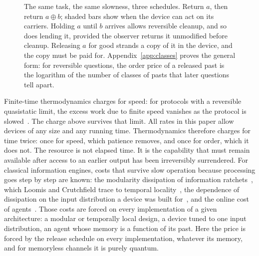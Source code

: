 \begin{figure}[t]
\centering
{}
\caption{The same task, the same slowness, three schedules. Return $a$, then return $a\oplus b$; shaded bars show when the device can act on its carriers. Holding $a$ until $b$ arrives allows reversible cleanup, and so does lending it, provided the observer returns it unmodified before cleanup. Releasing $a$ for good strands a copy of it in the device, and the copy must be paid for. Appendix~\ref{app:classes} proves the general form: for reversible questions, the order price of a released past is the logarithm of the number of classes of pasts that later questions tell apart.}
\label{fig:three}
\end{figure}

Finite-time thermodynamics charges for speed: for protocols with a reversible quasistatic limit, the excess work due to finite speed vanishes as the protocol is slowed~\cite{SalamonBerry83,Crooks07,Proesmans20}. The charge above survives that limit. All rates in this paper allow devices of any size and any running time. Thermodynamics therefore charges for time twice: once for speed, which patience removes, and once for order, which it does not. The resource is not elapsed time. It is the capability that must remain available after access to an earlier output has been irreversibly surrendered. For classical information engines, costs that survive slow operation because processing goes step by step are known: the modularity dissipation of information ratchets~\cite{BMC18}, which Loomis and Crutchfield trace to temporal locality~\cite{LoomisCrutchfield20}, the dependence of dissipation on the input distribution a device was built for~\cite{KolchinskyWolpert17}, and the online cost of agents~\cite{Thompson25}. Those costs are forced on every implementation of a given architecture: a modular or temporally local design, a device tuned to one input distribution, an agent whose memory is a function of its past. Here the price is forced by the release schedule on every implementation, whatever its memory, and for memoryless channels it is purely quantum.

